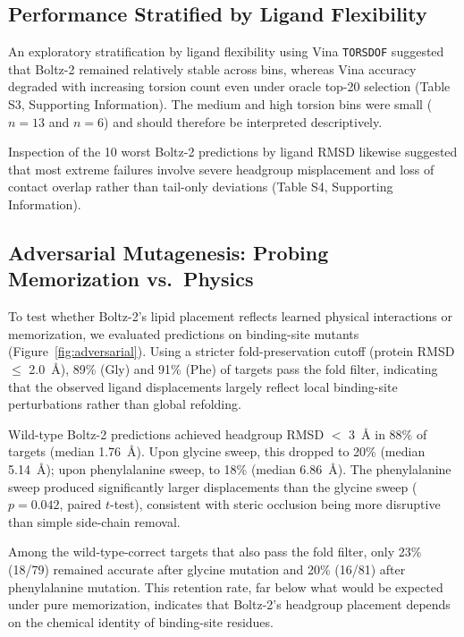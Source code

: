 \documentclass[journal=jcisd8,manuscript=article]{achemso}
\begin{document}
\subsection{Performance Stratified by Ligand Flexibility}

An exploratory stratification by ligand flexibility using Vina \texttt{TORSDOF} suggested that Boltz-2 remained relatively stable across bins, whereas Vina accuracy degraded with increasing torsion count even under oracle top-20 selection (Table S3, Supporting Information). The medium and high torsion bins were small ($n=13$ and $n=6$) and should therefore be interpreted descriptively.

Inspection of the 10 worst Boltz-2 predictions by ligand RMSD likewise suggested that most extreme failures involve severe headgroup misplacement and loss of contact overlap rather than tail-only deviations (Table S4, Supporting Information).

\subsection{Adversarial Mutagenesis: Probing Memorization vs.\ Physics}

To test whether Boltz-2's lipid placement reflects learned physical interactions or memorization, we evaluated predictions on binding-site mutants (Figure~\ref{fig:adversarial}).
Using a stricter fold-preservation cutoff (protein RMSD $\leq$ \SI{2.0}{\angstrom}), 89\% (Gly) and 91\% (Phe) of targets pass the fold filter, indicating that the observed ligand displacements largely reflect local binding-site perturbations rather than global refolding.

Wild-type Boltz-2 predictions achieved headgroup RMSD $<$ \SI{3}{\angstrom} in 88\% of targets (median \SI{1.76}{\angstrom}).
Upon glycine sweep, this dropped to 20\% (median \SI{5.14}{\angstrom}); upon phenylalanine sweep, to 18\% (median \SI{6.86}{\angstrom}).
The phenylalanine sweep produced significantly larger displacements than the glycine sweep ($p = 0.042$, paired $t$-test), consistent with steric occlusion being more disruptive than simple side-chain removal.

Among the wild-type-correct targets that also pass the fold filter, only 23\% (18/79) remained accurate after glycine mutation and 20\% (16/81) after phenylalanine mutation.
This retention rate, far below what would be expected under pure memorization, indicates that Boltz-2's headgroup placement depends on the chemical identity of binding-site residues.
\end{document}
